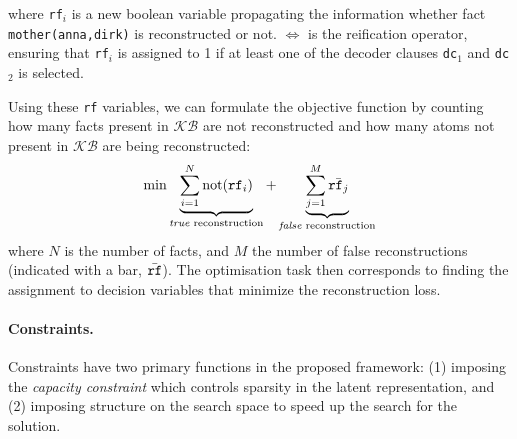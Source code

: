 where \texttt{rf}$_i$ is a new boolean variable propagating the information whether fact \texttt{mother(anna,dirk)} is reconstructed or not.
$\Leftrightarrow$ is the reification operator, ensuring that \texttt{rf}$_i$ is assigned to 1 if at least one of the decoder clauses \texttt{dc}$_1$ and \texttt{dc}$_2$ is selected.

Using these \texttt{rf} variables, we can formulate the objective function by counting how many facts present in $\mathcal{KB}$ are not reconstructed and how many atoms not present in $\mathcal{KB}$ are being reconstructed:
\begin{equation}
	\min \underbrace{\sum_{i=1}^{N}\text{not}(\text{\texttt{rf}}_i)}_{\text{\textit{true} reconstruction}} +  \underbrace{\sum_{j=1}^{M} \bar{\text{\texttt{rf}}_j}}_{\text{\textit{false} reconstruction}}
\end{equation}
where $N$ is the number of facts, and $M$ the number of false reconstructions (indicated with a bar, $\bar{\text{\texttt{rf}}}$). %
The optimisation task then corresponds to finding the assignment to decision variables that minimize the reconstruction loss.



\paragraph{Constraints.}
Constraints have two primary functions in the proposed framework: (1) imposing the \textit{capacity constraint} which controls sparsity in the latent representation, and (2) imposing structure on the search space to speed up the search for the solution.


